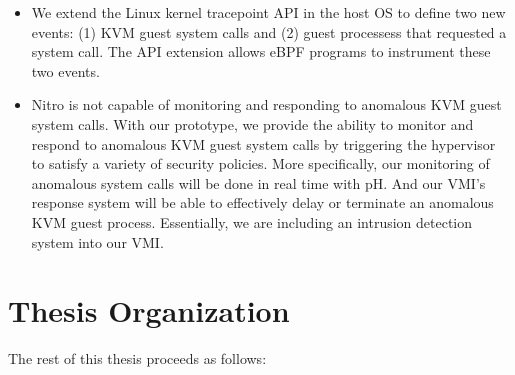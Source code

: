 \documentclass{report}
\begin{document}
\begin{spacing}{1.5}
{\begin{itemize}
  \item We extend the Linux kernel tracepoint API in the host OS to define two new events: (1) KVM guest system calls and (2) guest processess that requested a system call. The API extension allows eBPF programs to instrument these two events.
  
  \item Nitro is not capable of monitoring and responding to anomalous KVM guest system calls. With our prototype, we provide the ability to monitor and respond to anomalous KVM guest system calls by triggering the hypervisor to satisfy a variety of security policies. More specifically, our monitoring of anomalous system calls will be done in real time with pH. And our VMI's response system will be able to effectively delay or terminate an anomalous KVM guest process. Essentially, we are including an intrusion detection system into our VMI. 
\newline  
\end{itemize}
}









\section{Thesis Organization}
{\large
The rest of this thesis proceeds as follows:

}
\end{spacing}
\end{document}
